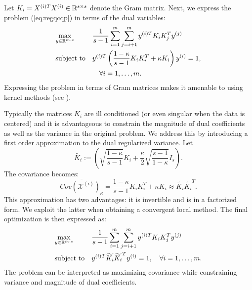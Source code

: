 
Let $K_i = X^{(i)T} X^{(i)} \in \mathbb{R}^{s \times s}$ denote the Gram
matrix. Next, we express the problem (\ref{eq:regqcqp}) in terms of the dual variables:
 \begin{equation}\label{eq:dualregqcqp}
\begin{aligned}
& \underset{y \in \RR^{m\cdot s}}{\text{max}}
& & \frac{1}{s -1} \sum_{i = 1}^m \sum_{j = i+1}^m y^{(i)T} K_i K_j^T y^{(j)} \\%
& \text{subject to}
& & y^{(i)T} \left(\frac{1- \kappa}{s - 1}K_i K_i^T + \kappa  K_i\right) y^{(i)} = 1,\\
& &&\quad\forall i = 1,\ldots, m.
\end{aligned}
\end{equation}
Expressing the problem in terms of Gram matrices makes it amenable to using kernel methods (see \cite{shawe-taylor04kernel}).%


Typically the matrices $K_i$ are ill conditioned (or even singular
when the data is centered) and it is advantageous to constrain the
magnitude of dual coefficients as well as the variance in the original
problem. We address this by introducing a first order approximation to
the dual regularized variance.  Let $$\widetilde{K_i} :=
\left(\sqrt{\frac{1-\kappa}{s - 1}}K_i + \frac{\kappa}{2}
  \sqrt{\frac{s-1}{1- \kappa}}I_s\right).$$ The covariance becomes:
%
 $$ \overline{Cov\left(\mathcal{X}^{(i)}\right)_{\kappa}} =  \frac{1- \kappa}{s - 1}K_i K_i^T + \kappa  K_i \approx  \widetilde{K_i} \widetilde{K_i}^T.$$
This approximation has two advantages: it is invertible and is in a
factorized form. We exploit the latter when obtaining a convergent local method.
The final optimization is then expressed as:
 \begin{equation}\label{eq:approxdualqcqp}
\begin{aligned}
& \underset{y \in \RR^{m\cdot s}}{\text{max}}
& & \frac{1}{s -1} \sum_{i = 1}^m \sum_{j = i+1}^m y^{(i)T} K_i K_j^T y^{(j)}\\%
& \text{subject to}
& & y^{(i)T} \widetilde{K_i} \widetilde{K_i}^T y^{(i)} = 1, \quad\forall i = 1,\ldots, m.
\end{aligned}
\end{equation}
%
The problem can be interpreted as maximizing covariance while constraining variance and magnitude of dual coefficients. %

